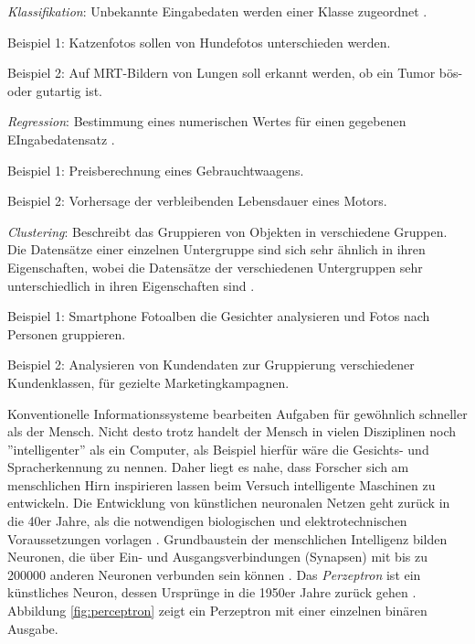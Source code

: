 \begin{itemize*}

\item \emph{Klassifikation}: Unbekannte Eingabedaten werden einer Klasse zugeordnet \cite [vgl. S. 68]{EM17}. 
\begin{itemize*}
\item Beispiel 1: Katzenfotos sollen von Hundefotos unterschieden werden.
\item Beispiel 2: Auf MRT-Bildern von Lungen soll erkannt werden, ob ein Tumor bös- oder gutartig ist.
\end{itemize*}
\item \emph{Regression}: Bestimmung eines numerischen Wertes für einen gegebenen EIngabedatensatz \cite {SG17}.   
\begin{itemize*}
\item Beispiel 1: Preisberechnung eines Gebrauchtwaagens.  
\item Beispiel 2: Vorhersage der verbleibenden Lebensdauer eines Motors.
\end{itemize*}
\item \emph{Clustering}: Beschreibt das Gruppieren von Objekten in verschiedene Gruppen. Die Datensätze einer einzelnen Untergruppe sind sich sehr ähnlich in ihren Eigenschaften, wobei die Datensätze der verschiedenen Untergruppen sehr unterschiedlich in ihren Eigenschaften sind \cite {SG17}.   
\begin{itemize*}
\item Beispiel 1: Smartphone Fotoalben die Gesichter analysieren und Fotos nach Personen gruppieren.  
\item Beispiel 2: Analysieren von Kundendaten zur Gruppierung verschiedener Kundenklassen, für gezielte Marketingkampagnen. 
\end{itemize*}

\end{itemize*}   

Konventionelle Informationssysteme bearbeiten Aufgaben für gewöhnlich schneller als der Mensch. Nicht desto trotz handelt der Mensch in vielen Disziplinen noch ''intelligenter'' als ein Computer, als Beispiel hierfür wäre die Gesichts- und Spracherkennung zu nennen. Daher liegt es nahe, dass Forscher sich am menschlichen Hirn inspirieren lassen beim Versuch intelligente Maschinen zu entwickeln. Die Entwicklung von künstlichen neuronalen Netzen geht zurück in die 40er Jahre, als die notwendigen biologischen und elektrotechnischen Voraussetzungen vorlagen \cite [vgl. S. 1]{HS97}. Grundbaustein der menschlichen Intelligenz bilden Neuronen, die über Ein- und Ausgangsverbindungen (Synapsen) mit bis zu 200000 anderen Neuronen verbunden sein können \cite [vgl. S. 5]{SS97}. Das \textit{Perzeptron} ist ein künstliches Neuron, dessen Ursprünge in die 1950er Jahre zurück gehen \cite [vgl. S. 7]{SS97}. Abbildung \ref{fig:perceptron} zeigt ein Perzeptron mit einer einzelnen binären Ausgabe. 

